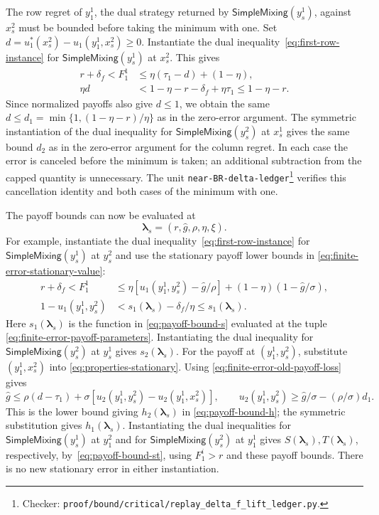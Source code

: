 \documentclass[11pt]{article}
\theoremstyle{remark}
\theoremstyle{plain}
\newcommand{\sm}{\mathsf{SimpleMixing}}
\begin{document}
The row regret of $y_1^1$, the dual strategy returned by
$\sm(y_s^1)$, against $x_s^2$ must be bounded before taking the
minimum with one. Set
$d=u_1^*(x_s^2)-u_1(y_1^1,x_s^2)\ge0$.
Instantiate the dual inequality~\eqref{eq:first-row-instance}
for $\sm(y_s^1)$ at $x_s^2$. This gives
\begin{equation}
 \begin{aligned}
 r+\delta_f<F_1^1&\le\eta(\tau_1-d)+(1-\eta),\\
 \eta d&<1-\eta-r-\delta_f+\eta\tau_1\le1-\eta-r.
 \end{aligned}
 \label{eq:finite-error-old-payoff-loss}
\end{equation}
Since normalized payoffs also give $d\le1$, we obtain the same
$d\le d_1=\min\{1,(1-\eta-r)/\eta\}$ as in the zero-error argument.
The symmetric instantiation of the dual inequality for
$\sm(y_s^2)$ at $x_s^1$ gives the same bound $d_2$ as in the
zero-error argument for the column regret. In each case the error is canceled before the minimum
is taken; an additional subtraction from the capped quantity is
unnecessary. The unit \nolinkurl{near-BR-delta-ledger}\footnote{Checker:
\nolinkurl{proof/bound/critical/replay_delta_f_lift_ledger.py}.\label{fn:checker-near-BR-delta-ledger}}
verifies this cancellation identity and both cases of the
minimum with one.

The payoff bounds can now be evaluated at
\begin{equation}
 \boldsymbol\lambda_s=(r,\hat g,\rho,\eta,\xi).
 \label{eq:finite-error-payoff-parameters}
\end{equation}
For example, instantiate the dual inequality~\eqref{eq:first-row-instance}
for $\sm(y_s^1)$ at $y_s^2$ and use the stationary payoff lower bounds in
\eqref{eq:finite-error-stationary-value}:
\begin{equation}
 \begin{aligned}
 r+\delta_f<F_1^1
 &\le\eta[u_1(y_1^1,y_s^2)-\hat g/\rho]
                   +(1-\eta)(1-\hat g/\sigma),\\
 1-u_1(y_1^1,y_s^2)
 &<s_1(\boldsymbol\lambda_s)-\delta_f/\eta\le s_1(\boldsymbol\lambda_s).
 \end{aligned}
 \label{eq:finite-error-first-payoff}
\end{equation}
Here $s_1(\boldsymbol\lambda_s)$ is the function in
\eqref{eq:payoff-bound-s} evaluated at the tuple
\eqref{eq:finite-error-payoff-parameters}. Instantiating the dual inequality for
$\sm(y_s^2)$ at $y_s^1$ gives $s_2(\boldsymbol\lambda_s)$.
For the payoff at $(y_1^1,y_s^2)$, substitute $(y_1^1,x_s^2)$ into
\eqref{eq:properties-stationary}. Using
\eqref{eq:finite-error-old-payoff-loss} gives
\[
 \hat g\le\rho(d-\tau_1)
       +\sigma[u_2(y_1^1,y_s^2)-u_2(y_1^1,x_s^2)],
 \qquad
 u_2(y_1^1,y_s^2)\ge \hat g/\sigma-(\rho/\sigma)d_1.
\]
This is the lower bound giving $h_2(\boldsymbol\lambda_s)$ in
\eqref{eq:payoff-bound-h}; the symmetric substitution gives $h_1(\boldsymbol\lambda_s)$.
Instantiating the dual inequalities for $\sm(y_s^1)$ at $y_1^2$
and for $\sm(y_s^2)$ at $y_1^1$ gives $S(\boldsymbol\lambda_s),T(\boldsymbol\lambda_s)$,
respectively, by~\eqref{eq:payoff-bound-st}, using $F_1^i>r$ and
these payoff bounds. There is no new stationary error in either
instantiation.
\end{document}
